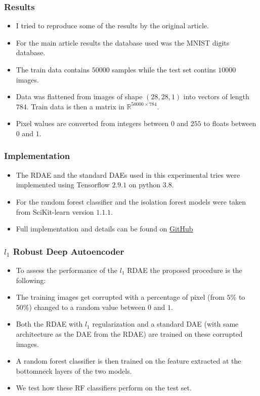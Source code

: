 \documentclass{beamer}
\theoremstyle{plain}
\theoremstyle{definition}
\theoremstyle{remark}
\newcommand{\R}{\mathbb{R}}
\begin{document}
\begin{frame}
	\frametitle{Results}
	\begin{itemize}
		\item I tried to reproduce some of the results by the original article.
		\item For the main article results the database used was the MNIST digits database.
		\item The train data contains $50000$ samples while the test set contins $10000$ images.
		\item Data was flattened from images of shape $(28,28,1)$ into vectors of length $784$. Train data is then a matrix in $\R^{50000\times 784}$.
		\item Pixel walues are converted from integers between $0$ and $255$ to floats between $0$ and $1$.
	\end{itemize}
\end{frame}

\begin{frame}
	\frametitle{Implementation}
	\begin{itemize}
		\item The RDAE and the standard DAEs used in this experimental tries were implemented using Tensorflow $2.9.1$ on python $3.8$.
		\item For the random forest classifier and the isolation forest models were taken from SciKit-learn version $1.1.1$.
		\item Full implementation and details can be found on \hyperref{https://github.com/AlexThirty/SaMLMfTSA}{}{}{GitHub}
	\end{itemize}
\end{frame}

\begin{frame}
	\frametitle{$l_1$ Robust Deep Autoencoder}
	\begin{itemize}
		\item To assess the performance of the $l_1$ RDAE the proposed procedure is the following:
		\item The training images get corrupted with a percentage of pixel (from $5\%$ to $50\%$) changed to a random value between $0$ and $1$.
		\item Both the RDAE with $l_1$ regularization and a standard DAE (with same architecture as the DAE from the RDAE) are trained on these corrupted images.
		\item A random forest classifier is then trained on the feature extracted at the bottomneck layers of the two models.
		\item We test how these RF classifiers perform on the test set.
	\end{itemize}
\end{frame}
\end{document}
